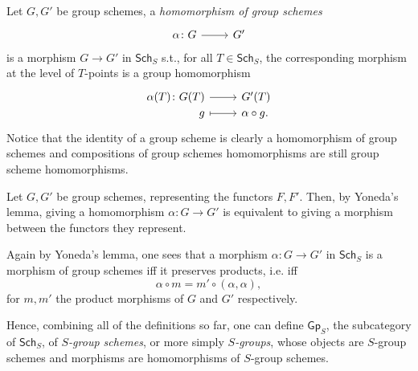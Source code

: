 \documentclass[../Main]{subfiles}
\begin{document}
\begin{defn}
	Let $G, G'$ be group schemes, a {\em homomorphism of group schemes}
	\begin{equation}
		\begin{tikzcd}
			\alpha\colon G \arrow[r, "", rightarrow] &
			G'
		\end{tikzcd}
	\end{equation} 
	is a morphism $G \to G'$ in $\mathsf{Sch}_{ S }$ s.t., for all
	$T \in \mathsf{Sch}_{ S }$, the corresponding morphism at the level of $T$-points
	is a group homomorphism
	\begin{equation}
	\begin{tikzcd}[row sep = 0ex
		,/tikz/column 1/.append style={anchor=base east}
		,/tikz/column 2/.append style={anchor=base west}]
		\alpha(T)\colon G(T) \arrow[r, "", rightarrow] &
		G'(T) \\
		g \arrow[r, "", mapsto] & \alpha \circ g.
	\end{tikzcd}
	\end{equation} 
	Notice that the identity of a group scheme is clearly a homomorphism of group
	schemes and compositions of group schemes homomorphisms are still
	group scheme homomorphisms.
\end{defn}


\begin{rem}
	Let $G, G'$ be group schemes, representing the functors $F,F'$.
	Then, by Yoneda's lemma, giving a homomorphism $\alpha\colon G \to G'$
	is equivalent to giving a morphism between the functors they represent.

	Again by Yoneda's lemma, one sees that a morphism $\alpha\colon G \to G'$
	in $\mathsf{Sch}_{ S }$ is a morphism of group schemes iff
	it preserves products, i.e. iff
	\begin{equation}
		\alpha \circ m = m' \circ (\alpha, \alpha)
	,\end{equation} 
	for $m, m'$ the product morphisms of $G$ and $G'$ respectively.
\end{rem}


\begin{defn}
	Hence, combining all of the definitions so far, 
	one can define $\mathsf{Gp}_S$, the subcategory of $\mathsf{Sch}_{ S }$,
	of {\em $S$-group schemes}, or more simply {\em $S$-groups},
	whose objects are $S$-group schemes
	and morphisms are homomorphisms of $S$-group schemes.
\end{defn}
\end{document}
